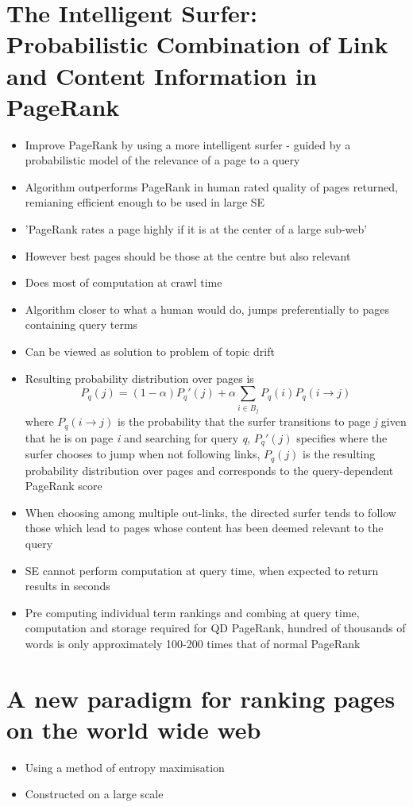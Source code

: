 \documentclass[11pt]{report}
\begin{document}
\section{The Intelligent Surfer:
Probabilistic Combination of Link and
Content Information in PageRank}
\begin{itemize}
\item Improve PageRank by using a more intelligent surfer - guided by a probabilistic model of the relevance of a page to a query
\item Algorithm outperforms PageRank in human rated quality of pages returned, remianing efficient enough to be used in large SE
\item 'PageRank rates a page highly if it is at the center of a large sub-web'
\item However best pages should be those at the centre but also relevant
\item Does most of computation at crawl time
\item Algorithm closer to what a human would do, jumps preferentially to pages containing query terms
\item Can be viewed as solution to problem of topic drift
\item Resulting probability distribution over pages is \begin{equation}
P_q(j)=(1-\alpha)P_q'(j)+\alpha\sum_{i\in B_j}P_q(i)P_q(i\rightarrow j)
\end{equation} where $P_q(i\rightarrow j)$ is the probability that the surfer transitions to page \textit{j} given that he is on page \textit{i} and searching for query \textit{q}, $P_q'(j)$ specifies where the surfer chooses to jump when not following links, $P_q(j)$ is the resulting probability distribution over pages and corresponds to the query-dependent PageRank score
\item When choosing among multiple out-links, the directed surfer tends to follow those which lead to pages whose content has been deemed relevant to the query
\item SE cannot perform computation at query time, when expected to return results in seconds
\item Pre computing individual term rankings and combing at query time, computation and storage required for QD PageRank, hundred of thousands of words is only approximately 100-200 times that of normal PageRank
\end{itemize}
\section{A new paradigm for ranking pages on the world wide web}
\begin{itemize}
\item Using a method of entropy maximisation
\item Constructed on a large scale 
\end{itemize}
\end{document}
